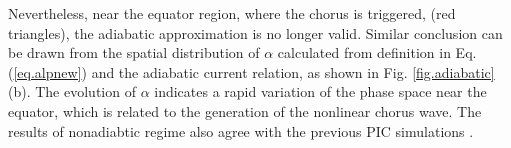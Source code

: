 Nevertheless, near the equator region, where the chorus is triggered, (red triangles), the adiabatic approximation is no longer valid.
Similar conclusion can be drawn from the spatial distribution of $\alpha$ calculated from definition in Eq. (\ref{eq.alpnew}) and the adiabatic current relation, as shown in Fig. \ref{fig.adiabatic}(b). 
The evolution of $\alpha$ indicates a rapid variation of the phase space near the equator, which is related to the generation of the nonlinear chorus wave.
The results of nonadiabtic regime also agree with the previous PIC simulations \cite{tao2017a,tao2017b}.
